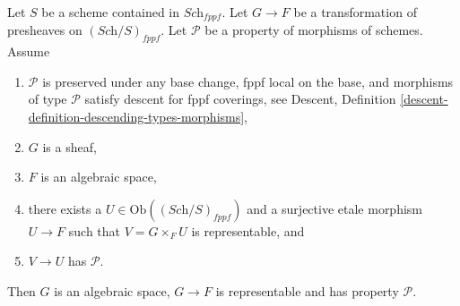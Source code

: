 \begin{lemma}
\label{lemma-morphism-sheaves-with-P-effective-descent-etale}
Let $S$ be a scheme contained in $\textit{Sch}_{fppf}$.
Let $G \to F$ be a transformation of presheaves on $(\textit{Sch}/S)_{fppf}$.
Let $\mathcal{P}$ be a property of morphisms of schemes.
Assume
\begin{enumerate}
\item $\mathcal{P}$ is preserved under any base change, fppf local on the
base, and morphisms of type $\mathcal{P}$ satisfy descent for fppf coverings,
see Descent, Definition \ref{descent-definition-descending-types-morphisms},
\item $G$ is a sheaf,
\item $F$ is an algebraic space,
\item there exists a $U \in \text{Ob}((\textit{Sch}/S)_{fppf})$
and a surjective etale morphism $U \to F$ such that
$V = G \times_F U$ is representable, and
\item $V \to U$ has $\mathcal{P}$.
\end{enumerate}
Then $G$ is an algebraic space, $G \to F$ is representable and has property
$\mathcal{P}$.
\end{lemma}

